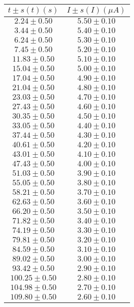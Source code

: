 \begin{table}[H]
\centering
\setlength{\arrayrulewidth}{1.2pt}
\begin{tabular}{|c|c|}
\hline
$t \pm s(t) (s)$ & $I \pm s(I) (\mu A)$ \\
\hline
$2.24 \pm 0.50$ & $5.50 \pm 0.10$ \\
$3.44 \pm 0.50$ & $5.40 \pm 0.10$ \\
$6.24 \pm 0.50$ & $5.30 \pm 0.10$ \\
$7.45 \pm 0.50$ & $5.20 \pm 0.10$ \\
$11.83 \pm 0.50$ & $5.10 \pm 0.10$ \\
$15.04 \pm 0.50$ & $5.00 \pm 0.10$ \\
$17.04 \pm 0.50$ & $4.90 \pm 0.10$ \\
$21.04 \pm 0.50$ & $4.80 \pm 0.10$ \\
$23.03 \pm 0.50$ & $4.70 \pm 0.10$ \\
$27.43 \pm 0.50$ & $4.60 \pm 0.10$ \\
$30.35 \pm 0.50$ & $4.50 \pm 0.10$ \\
$33.05 \pm 0.50$ & $4.40 \pm 0.10$ \\
$37.44 \pm 0.50$ & $4.30 \pm 0.10$ \\
$40.61 \pm 0.50$ & $4.20 \pm 0.10$ \\
$43.01 \pm 0.50$ & $4.10 \pm 0.10$ \\
$47.43 \pm 0.50$ & $4.00 \pm 0.10$ \\
$51.03 \pm 0.50$ & $3.90 \pm 0.10$ \\
$55.05 \pm 0.50$ & $3.80 \pm 0.10$ \\
$58.21 \pm 0.50$ & $3.70 \pm 0.10$ \\
$62.63 \pm 0.50$ & $3.60 \pm 0.10$ \\
$66.20 \pm 0.50$ & $3.50 \pm 0.10$ \\
$71.82 \pm 0.50$ & $3.40 \pm 0.10$ \\
$74.19 \pm 0.50$ & $3.30 \pm 0.10$ \\
$79.81 \pm 0.50$ & $3.20 \pm 0.10$ \\
$84.59 \pm 0.50$ & $3.10 \pm 0.10$ \\
$89.02 \pm 0.50$ & $3.00 \pm 0.10$ \\
$93.42 \pm 0.50$ & $2.90 \pm 0.10$ \\
$100.25 \pm 0.50$ & $2.80 \pm 0.10$ \\
$104.98 \pm 0.50$ & $2.70 \pm 0.10$ \\
$109.80 \pm 0.50$ & $2.60 \pm 0.10$ \\

\end{tabular}
\end{table}
